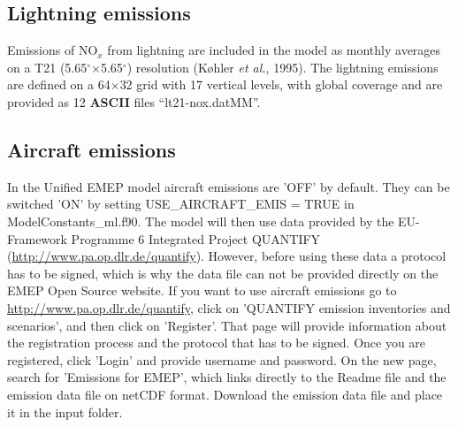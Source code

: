 \subsection{Lightning emissions}
Emissions of NO$_{x}$ from lightning are included in the model
as monthly averages on a T21 (5.65$^{\circ}$$\times$5.65$^{\circ}$) resolution (K{\o}hler {\sl et al.}, 1995). 
The lightning emissions are defined on a 64$\times$32 grid with 17 vertical
levels, with global coverage and are provided as 12 {\bf ASCII} files
``lt21-nox.datMM''.


\subsection{Aircraft emissions}
In the Unified EMEP model aircraft emissions are 'OFF' by default. 
They can be switched 'ON' by setting USE\_AIRCRAFT\_EMIS = TRUE in ModelConstants\_ml.f90. 
The model will then use data provided by the EU-Framework Programme 6 Integrated 
Project QUANTIFY (\url{http://www.pa.op.dlr.de/quantify}). However, before using 
these data a protocol has to be signed, which is why the data file can not be provided 
directly on the EMEP Open Source website. If you want to use aircraft emissions go to 
\url{http://www.pa.op.dlr.de/quantify}, click on 'QUANTIFY emission inventories and scenarios', 
and then click on 'Register'. That page will provide information about the registration 
process and the protocol that has to be signed. Once you are registered, click 'Login' and 
provide username and password. On the new page, search for 'Emissions for EMEP', which 
links directly to the Readme file and the emission data file on netCDF format. Download the 
emission data file and place it in the input folder.

